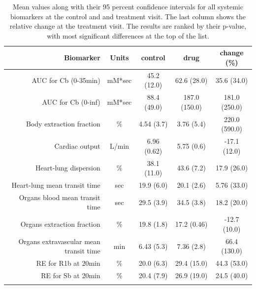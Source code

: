 \documentclass{epflreport}%
\begin{document}
\begin{longtable}{rcccc}%
\hline%
Biomarker&Units&control&drug&change (\%)\\%
\hline%
AUC for Cb (0{-}35min)&mM*sec&45.2 (12.0) &62.6 (28.0) &35.6 (34.0) \\%
AUC for Cb (0{-}inf)&mM*sec&88.4 (49.0) &187.0 (150.0) &181.0 (250.0) \\%
Body extraction fraction&\%&4.54 (3.7) &3.76 (5.4) &220.0 (590.0) \\%
Cardiac output&L/min&6.96 (0.62) &5.75 (0.6) &{-}17.1 (12.0) \\%
Heart{-}lung dispersion&\%&38.1 (11.0) &43.6 (7.2) &17.9 (26.0) \\%
Heart{-}lung mean transit time&sec&19.9 (6.0) &20.1 (2.6) &5.76 (33.0) \\%
Organs blood mean transit time&sec&29.5 (3.9) &34.5 (3.8) &18.2 (20.0) \\%
Organs extraction fraction&\%&19.8 (1.8) &17.2 (0.46) &{-}12.7 (10.0) \\%
Organs extravascular mean transit time&min&6.43 (5.3) &7.36 (2.8) &66.4 (130.0) \\%
RE for R1b at 20min&\%&20.0 (6.3) &29.4 (15.0) &44.3 (53.0) \\%
RE for Sb at 20min&\%&20.4 (7.9) &26.9 (19.0) &24.5 (40.0) \\%
\hline%
\caption{Mean values along with their 95 percent confidence intervals for all systemic biomarkers at the control and and treatment visit. The last column shows the relative change at the treatment visit. The results are ranked by their p-value, with most significant differences at the top of the list.} \\%
\end{longtable}%
\end{document}
